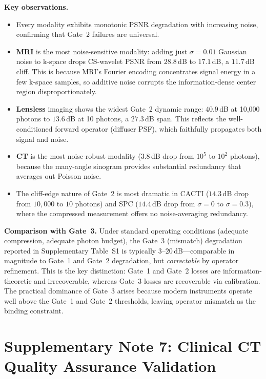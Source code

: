 \documentclass[11pt]{article}
\theoremstyle{definition}
\begin{document}
\noindent\textbf{Key observations.}
\begin{itemize}
  \item Every modality exhibits monotonic PSNR degradation with
    increasing noise, confirming that Gate~2 failures are universal.
  \item \textbf{MRI} is the most noise-sensitive modality: adding just
    $\sigma{=}0.01$ Gaussian noise to k-space drops CS-wavelet PSNR from
    $28.8$\,dB to $17.1$\,dB, a $11.7$\,dB cliff. This is because MRI's
    Fourier encoding concentrates signal energy in a few k-space samples,
    so additive noise corrupts the information-dense center region
    disproportionately.
  \item \textbf{Lensless} imaging shows the widest Gate~2 dynamic range:
    $40.9$\,dB at 10,000 photons to $13.6$\,dB at 10 photons, a $27.3$\,dB
    span. This reflects the well-conditioned forward operator (diffuser PSF),
    which faithfully propagates both signal and noise.
  \item \textbf{CT} is the most noise-robust modality ($3.8$\,dB drop from
    $10^5$ to $10^2$ photons), because the many-angle sinogram provides
    substantial redundancy that averages out Poisson noise.
  \item The cliff-edge nature of Gate~2 is most dramatic in CACTI
    ($14.3$\,dB drop from $10{,}000$ to $10$ photons) and SPC
    ($14.4$\,dB drop from $\sigma{=}0$ to $\sigma{=}0.3$), where the
    compressed measurement offers no noise-averaging redundancy.
\end{itemize}

\noindent\textbf{Comparison with Gate~3.}
Under standard operating conditions (adequate compression, adequate
photon budget), the Gate~3 (mismatch) degradation reported in
Supplementary Table~S1 is typically $3$--$20$\,dB---comparable in
magnitude to Gate~1 and Gate~2 degradation, but \emph{correctable} by
operator refinement.  This is the key distinction: Gate~1 and Gate~2
losses are information-theoretic and irrecoverable, whereas Gate~3
losses are recoverable via calibration.  The practical dominance of
Gate~3 arises because modern instruments operate well above the Gate~1
and Gate~2 thresholds, leaving operator mismatch as the binding
constraint.


\newpage
\section{Supplementary Note 7: Clinical CT Quality Assurance Validation}
\label{sec:ctqc}
\end{document}
